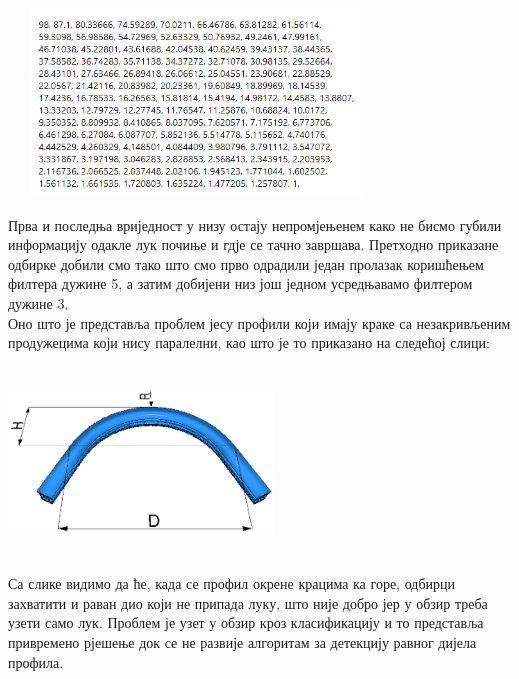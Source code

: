 \documentclass[12pt]{article}
\begin{document}
\vspace{0.5cm}
\begin{center}
    \centering 
    \includegraphics[height=5cm, width=10cm]{images/12_odbirci_average.png}
\end{center}
\vspace{0.5cm}
Прва и последња вриједност у низу остају непромјењенем како не бисмо губили информацију одакле лук почиње и гдје се тачно завршава. Претходно приказане одбирке добили смо тако што смо прво одрадили један пролазак коришћењем филтера дужине 5, а затим добијени низ још једном усредњавамо филтером дужине 3.\\
Оно што је представља проблем јесу профили који имају краке са незакривљеним продужецима који нису паралелни, као што је то приказано на следећој слици:
\vspace{0.5cm}
\begin{center}
    \centering 
    \includegraphics[height=5cm, width=7cm]{images/klasa3.jpg}
\end{center}
\vspace{0.5cm}
Са слике видимо да ће, када се профил окрене крацима ка горе, одбирци захватити и раван дио који не припада луку, што није добро јер у обзир треба узети само лук. Проблем је узет у обзир кроз класификацију и то представља привремено рјешење док се не развије алгоритам за детекцију равног дијела профила.


\newpage
\end{document}
